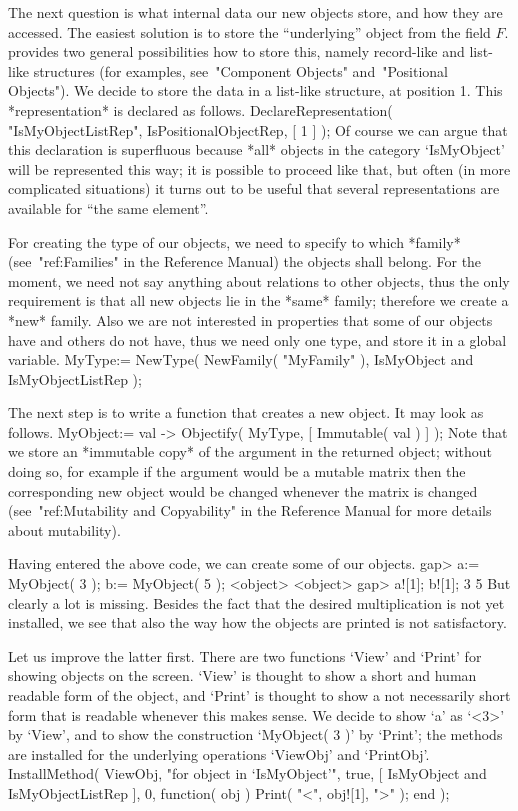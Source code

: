 The next question is what internal data our new objects store,
and how they are accessed.
The easiest solution is to store the ``underlying'' object from the
field $F$.
{\GAP} provides two general possibilities how to store this,
namely record-like and list-like structures
(for examples, see~"Component Objects" and~"Positional Objects").
We decide to store the data in a list-like structure, at position 1.
This *representation* is declared as follows.
\begintt
DeclareRepresentation( "IsMyObjectListRep", IsPositionalObjectRep, [ 1 ] );
\endtt
Of course we can argue that this declaration is superfluous
because *all* objects in the category `IsMyObject' will be represented
this way;
it is possible to proceed like that,
but often (in more complicated situations) it turns out to be useful 
that several representations are available for ``the same element''.

For creating the type of our objects, we need to specify to which *family*
(see~"ref:Families" in the Reference Manual) the objects shall belong.
For the moment, we need not say anything about relations to other {\GAP}
objects,
thus the only requirement is that all new objects lie in the *same* family;
therefore we create a *new* family.
Also we are not interested in properties that some of our objects have
and others do not have,
thus we need only one type,
and store it in a global variable.
\begintt
MyType:= NewType( NewFamily( "MyFamily" ),
                  IsMyObject and IsMyObjectListRep );
\endtt

The next step is to write a function that creates a new object.
It may look as follows.
\begintt
MyObject:= val -> Objectify( MyType, [ Immutable( val ) ] );
\endtt
Note that we store an *immutable copy* of the argument in the returned
object;
without doing so, for example if the argument would be a mutable matrix
then the corresponding new object would be changed whenever the matrix
is changed
(see~"ref:Mutability and Copyability" in the Reference Manual for more
details about mutability).

Having entered the above {\GAP} code, we can create some of our objects.
\begintt
gap> a:= MyObject( 3 );  b:= MyObject( 5 );
<object>
<object>
gap> a![1];  b![1];
3
5
\endtt
But clearly a lot is missing.
Besides the fact that the desired multiplication is not yet installed,
we see that also the way how the objects are printed is not satisfactory.

Let us improve the latter first.
There are two {\GAP} functions `View' and `Print' for showing objects
on the screen.
`View' is thought to show a short and human readable form of the object,
and `Print' is thought to show a not necessarily short form that is
{\GAP} readable whenever this makes sense.
We decide to show `a' as `<3>' by `View', and to show the construction
`MyObject( 3 )' by `Print';
the methods are installed for the underlying operations `ViewObj' and
`PrintObj'.
\begintt
InstallMethod( ViewObj,
    "for object in `IsMyObject'",
    true,
    [ IsMyObject and IsMyObjectListRep ], 0,
    function( obj )
    Print( "<", obj![1], ">" );
    end );

